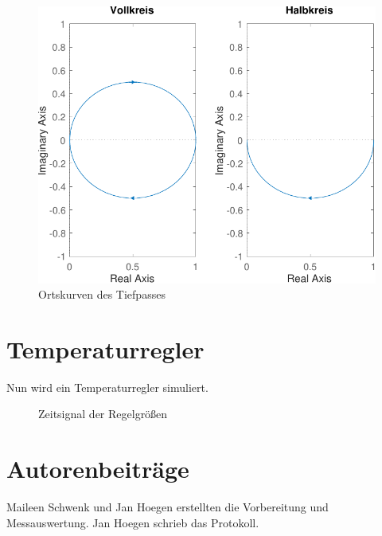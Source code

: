 \documentclass[
    paper=a4,
    fontsize=10pt,
    DIV=calc,
    twocolumn,
    oneside,
]{scrartcl}
\begin{document}
    \begin{figure}
        \centering
        \includegraphics[width=\imagewidth]{../versuch1/ortskurve.pdf}
        \caption{Ortskurven des Tiefpasses}
        \label{fig:ortskurve}
    \end{figure}

\section{Temperaturregler}
    Nun wird ein Temperaturregler simuliert. 

    \begin{figure}
        \centering
        
        \caption{Zeitsignal der Regelgrößen}
        \label{fig:temp_regler}
    \end{figure}


\printbibliography[heading=bibnumbered]

\section{Autorenbeiträge}
    Maileen Schwenk und Jan Hoegen erstellten die Vorbereitung und Messauswertung. Jan Hoegen schrieb das Protokoll.
\end{document}
